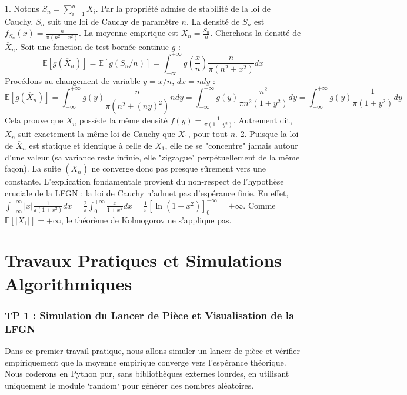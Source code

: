 \documentclass[11pt,a4paper]{article}
\begin{document}
1. Notons $S_n = \sum_{i=1}^n X_i$. Par la propriété admise de stabilité de la loi de Cauchy, $S_n$ suit une loi de Cauchy de paramètre $n$. La densité de $S_n$ est $f_{S_n}(x) = \frac{n}{\pi(n^2 + x^2)}$.
   La moyenne empirique est $\overline{X}_n = \frac{S_n}{n}$.
   Cherchons la densité de $\overline{X}_n$. Soit une fonction de test bornée continue $g$ :
   $$ \mathbb{E}[g(\overline{X}_n)] = \mathbb{E}[g(S_n / n)] = \int_{-\infty}^{+\infty} g\left(\frac{x}{n}\right) \frac{n}{\pi(n^2 + x^2)} dx $$
   Procédons au changement de variable $y = x/n$, $dx = n dy$ :
   $$ \mathbb{E}[g(\overline{X}_n)] = \int_{-\infty}^{+\infty} g(y) \frac{n}{\pi(n^2 + (ny)^2)} n dy = \int_{-\infty}^{+\infty} g(y) \frac{n^2}{\pi n^2(1 + y^2)} dy = \int_{-\infty}^{+\infty} g(y) \frac{1}{\pi(1+y^2)} dy $$
   Cela prouve que $\overline{X}_n$ possède la même densité $f(y) = \frac{1}{\pi(1+y^2)}$.
   Autrement dit, $\overline{X}_n$ suit exactement la même loi de Cauchy que $X_1$, pour tout $n$.
2. Puisque la loi de $\overline{X}_n$ est statique et identique à celle de $X_1$, elle ne se "concentre" jamais autour d'une valeur (sa variance reste infinie, elle "zigzague" perpétuellement de la même façon). La suite $(\overline{X}_n)$ ne converge donc pas presque sûrement vers une constante.
   L'explication fondamentale provient du non-respect de l'hypothèse cruciale de la LFGN : la loi de Cauchy n'admet pas d'espérance finie.
   En effet, $\int_{-\infty}^{+\infty} |x| \frac{1}{\pi(1+x^2)} dx = \frac{2}{\pi} \int_0^{+\infty} \frac{x}{1+x^2} dx = \frac{1}{\pi} [\ln(1+x^2)]_0^{+\infty} = +\infty$.
   Comme $\mathbb{E}[|X_1|] = +\infty$, le théorème de Kolmogorov ne s'applique pas.



\newpage
\part{Travaux Pratiques et Simulations Algorithmiques}
\section*{TP 1 : Simulation du Lancer de Pièce et Visualisation de la LFGN}

Dans ce premier travail pratique, nous allons simuler un lancer de pièce et vérifier empiriquement que la moyenne empirique converge vers l'espérance théorique.
Nous coderons en Python pur, sans bibliothèques externes lourdes, en utilisant uniquement le module `random` pour générer des nombres aléatoires.
\end{document}
